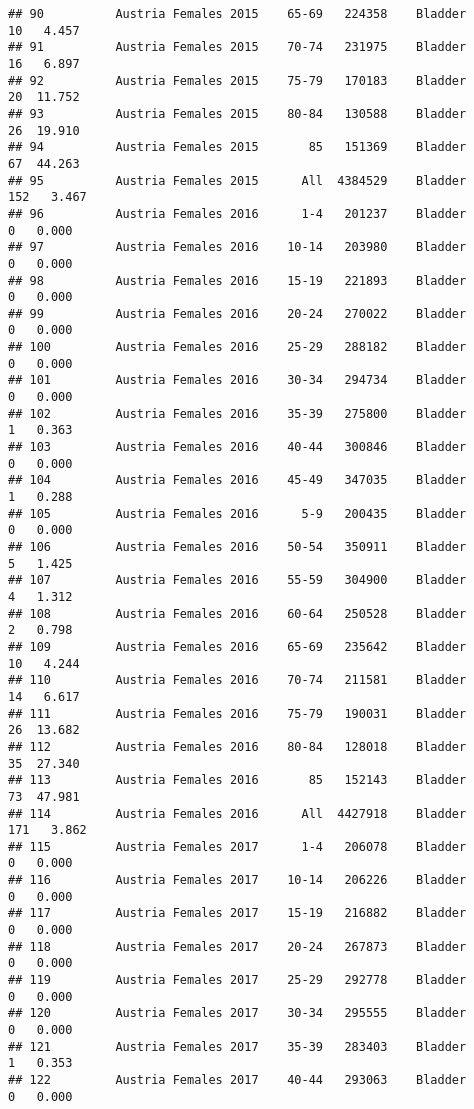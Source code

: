 \documentclass[
]{article}
\begin{document}
\begin{verbatim}
## 90          Austria Females 2015    65-69   224358    Bladder     10   4.457
## 91          Austria Females 2015    70-74   231975    Bladder     16   6.897
## 92          Austria Females 2015    75-79   170183    Bladder     20  11.752
## 93          Austria Females 2015    80-84   130588    Bladder     26  19.910
## 94          Austria Females 2015       85   151369    Bladder     67  44.263
## 95          Austria Females 2015      All  4384529    Bladder    152   3.467
## 96          Austria Females 2016      1-4   201237    Bladder      0   0.000
## 97          Austria Females 2016    10-14   203980    Bladder      0   0.000
## 98          Austria Females 2016    15-19   221893    Bladder      0   0.000
## 99          Austria Females 2016    20-24   270022    Bladder      0   0.000
## 100         Austria Females 2016    25-29   288182    Bladder      0   0.000
## 101         Austria Females 2016    30-34   294734    Bladder      0   0.000
## 102         Austria Females 2016    35-39   275800    Bladder      1   0.363
## 103         Austria Females 2016    40-44   300846    Bladder      0   0.000
## 104         Austria Females 2016    45-49   347035    Bladder      1   0.288
## 105         Austria Females 2016      5-9   200435    Bladder      0   0.000
## 106         Austria Females 2016    50-54   350911    Bladder      5   1.425
## 107         Austria Females 2016    55-59   304900    Bladder      4   1.312
## 108         Austria Females 2016    60-64   250528    Bladder      2   0.798
## 109         Austria Females 2016    65-69   235642    Bladder     10   4.244
## 110         Austria Females 2016    70-74   211581    Bladder     14   6.617
## 111         Austria Females 2016    75-79   190031    Bladder     26  13.682
## 112         Austria Females 2016    80-84   128018    Bladder     35  27.340
## 113         Austria Females 2016       85   152143    Bladder     73  47.981
## 114         Austria Females 2016      All  4427918    Bladder    171   3.862
## 115         Austria Females 2017      1-4   206078    Bladder      0   0.000
## 116         Austria Females 2017    10-14   206226    Bladder      0   0.000
## 117         Austria Females 2017    15-19   216882    Bladder      0   0.000
## 118         Austria Females 2017    20-24   267873    Bladder      0   0.000
## 119         Austria Females 2017    25-29   292778    Bladder      0   0.000
## 120         Austria Females 2017    30-34   295555    Bladder      0   0.000
## 121         Austria Females 2017    35-39   283403    Bladder      1   0.353
## 122         Austria Females 2017    40-44   293063    Bladder      0   0.000

\end{verbatim}
\end{document}
